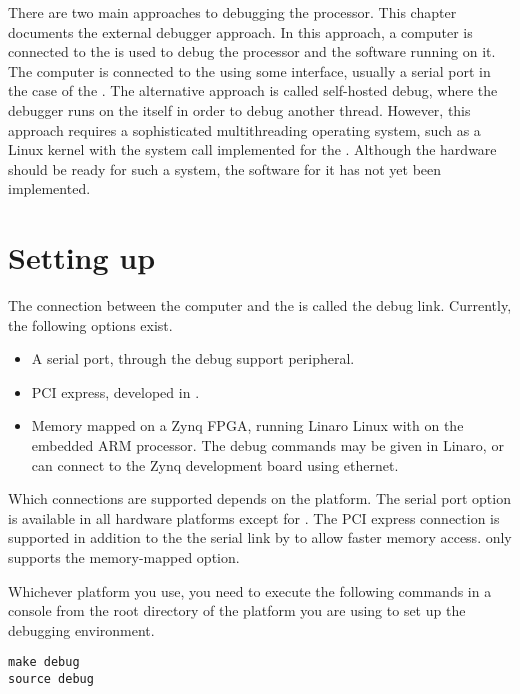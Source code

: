 \label{sec:rvd}

There are two main approaches to debugging the \rvex{} processor. This chapter 
documents the external debugger approach. In this approach, a computer is 
connected to the \rvex{} is used to debug the processor and the software running 
on it. The computer is connected to the \rvex{} using some interface, usually a
serial port in the case of the \rvex{}. The alternative approach is called
self-hosted debug, where the debugger runs on the \rvex{} itself in order to
debug another thread. However, this approach requires a sophisticated
multithreading operating system, such as a Linux kernel with the 
system call implemented for the \rvex{}. Although the hardware should be ready
for such a system, the software for it has not yet been implemented.

\section{Setting up}
\label{sec:rvd-start}

The connection between the computer and the \rvex{} is called the debug link.
Currently, the following options exist.

\begin{itemize}
\item A serial port, through the \rvex{} debug support peripheral.
\item PCI express, developed in \cite{vanderwijst2015}.
\item Memory mapped on a Zynq FPGA, running Linaro Linux with  on
the embedded ARM processor. The debug commands may be given in Linaro, or
 can connect to the Zynq development board using ethernet.
\end{itemize}

\noindent Which connections are supported depends on the platform. The serial
port option is available in all hardware platforms except for
. The PCI express connection is supported in addition to
the the serial link by  to allow faster memory access.
 only supports the memory-mapped option.

Whichever platform you use, you need to execute the following commands in a
console from the root directory of the platform you are using to set up the
debugging environment.

\begin{lstlisting}[numbers=none, language=nothing]
make debug
source debug
\end{lstlisting}

